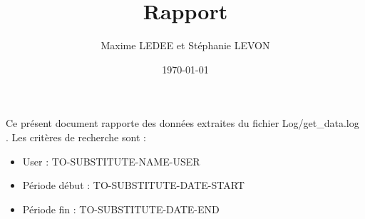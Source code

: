 \documentclass[a4paper,11pt,tikz]{article}
\title{Rapport} %
\author{Maxime LEDEE et Stéphanie LEVON} %
\date{\today} %
\begin{document}
  \maketitle

  Ce présent document rapporte des données extraites du fichier Log/get\_data.log . Les critères de recherche sont :
  \begin{itemize}
    \item User : TO-SUBSTITUTE-NAME-USER
    \item Période début : TO-SUBSTITUTE-DATE-START
    \item Période fin : TO-SUBSTITUTE-DATE-END
  \end{itemize}

  \tableofcontents
\end{document}

